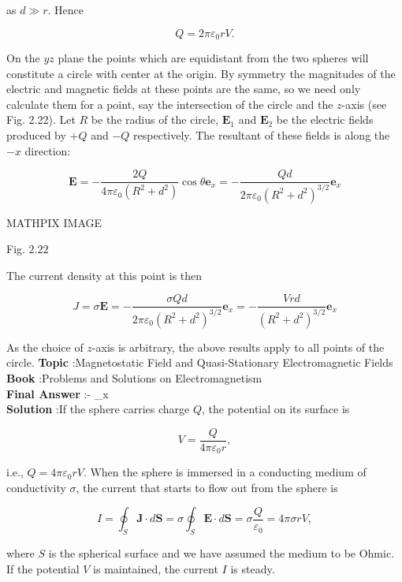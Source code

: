 \documentclass[10pt]{article}
\begin{document}
as $d \gg r$. Hence

$$
Q=2 \pi \varepsilon_{0} r V .
$$

On the $y z$ plane the points which are equidistant from the two spheres will constitute a circle with center at the origin. By symmetry the magnitudes of the electric and magnetic fields at these points are the same, so we need only calculate them for a point, say the intersection of the circle and the $z$-axis (see Fig. 2.22). Let $R$ be the radius of the circle, $\mathbf{E}_{1}$ and $\mathbf{E}_{2}$ be the electric fields produced by $+Q$ and $-Q$ respectively. The resultant of these fields is along the $-x$ direction:

$$
\mathbf{E}=-\frac{2 Q}{4 \pi \varepsilon_{0}\left(R^{2}+d^{2}\right)} \cos \theta \mathbf{e}_{x}=-\frac{Q d}{2 \pi \varepsilon_{0}\left(R^{2}+d^{2}\right)^{3 / 2}} \mathbf{e}_{x}
$$



MATHPIX IMAGE

Fig. $2.22$

The current density at this point is then

$$
J=\sigma \mathbf{E}=-\frac{\sigma Q d}{2 \pi \varepsilon_{0}\left(R^{2}+d^{2}\right)^{3 / 2}} \mathbf{e}_{x}=-\frac{V r d}{\left(R^{2}+d^{2}\right)^{3 / 2}} \mathbf{e}_{x}
$$

As the choice of $z$-axis is arbitrary, the above results apply to all points of the circle.
\textbf{Topic} :Magnetostatic Field and Quasi-Stationary Electromagnetic Fields\\
\textbf{Book} :Problems and Solutions on Electromagnetism\\
\textbf{Final Answer} :- _{x}\\


\textbf{Solution} :If the sphere carries charge $Q$, the potential on its surface is

$$
V=\frac{Q}{4 \pi \varepsilon_{0} r},
$$

i.e., $Q=4 \pi \varepsilon_{0} r V$. When the sphere is immersed in a conducting medium of conductivity $\sigma$, the current that starts to flow out from the sphere is

$$
I=\oint_{S} \mathbf{J} \cdot d \mathbf{S}=\sigma \oint_{S} \mathbf{E} \cdot d \mathbf{S}=\sigma \frac{Q}{\varepsilon_{0}}=4 \pi \sigma r V,
$$

where $S$ is the spherical surface and we have assumed the medium to be Ohmic. If the potential $V$ is maintained, the current $I$ is steady.
\end{document}
